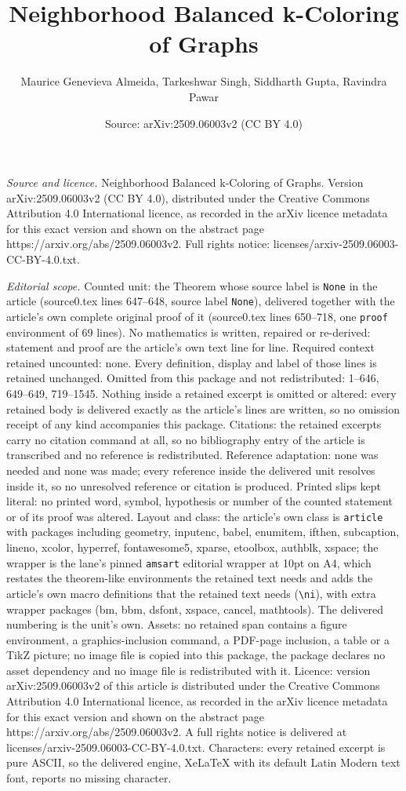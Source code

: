 \documentclass[10pt,a4paper]{amsart}
\title[Neighborhood Balanced k-Coloring of Graphs]{Neighborhood Balanced k-Coloring of Graphs}
\author{Maurice Genevieva Almeida, Tarkeshwar Singh, Siddharth Gupta, Ravindra Pawar}
\date{Source: arXiv:2509.06003v2 (CC BY 4.0)}
\begin{document}
\maketitle

\noindent\emph{Source and licence.} Neighborhood Balanced k-Coloring of Graphs. Version arXiv:2509.06003v2 (CC BY 4.0), distributed under the Creative Commons Attribution 4.0 International licence, as recorded in the arXiv licence metadata for this exact version and shown on the abstract page https://arxiv.org/abs/2509.06003v2. Full rights notice: licenses/arxiv-2509.06003-CC-BY-4.0.txt.\par\smallskip

\noindent\textit{Editorial scope.} Counted unit: the Theorem whose source label is \texttt{None} in the article (source0.tex lines 647--648, source label \texttt{None}), delivered together with the article's own complete original proof of it (source0.tex lines 650--718, one \texttt{proof} environment of 69 lines). No mathematics is written, repaired or re-derived: statement and proof are the article's own text line for line. Required context retained uncounted: none. Every definition, display and label of those lines is retained unchanged. Omitted from this package and not redistributed: 1--646, 649--649, 719--1545. Nothing inside a retained excerpt is omitted or altered: every retained body is delivered exactly as the article's lines are written, so no omission receipt of any kind accompanies this package. Citations: the retained excerpts carry no citation command at all, so no bibliography entry of the article is transcribed and no reference is redistributed. Reference adaptation: none was needed and none was made; every reference inside the delivered unit resolves inside it, so no unresolved reference or citation is produced. Printed slips kept literal: no printed word, symbol, hypothesis or number of the counted statement or of its proof was altered. Layout and class: the article's own class is \texttt{article} with packages including geometry, inputenc, babel, enumitem, ifthen, subcaption, lineno, xcolor, hyperref, fontawesome5, xparse, etoolbox, authblk, xspace; the wrapper is the lane's pinned \texttt{amsart} editorial wrapper at 10pt on A4, which restates the theorem-like environments the retained text needs and adds the article's own macro definitions that the retained text needs (\texttt{\textbackslash ni}), with extra wrapper packages (bm, bbm, dsfont, xspace, cancel, mathtools). The delivered numbering is the unit's own. Assets: no retained span contains a figure environment, a graphics-inclusion command, a PDF-page inclusion, a table or a TikZ picture; no image file is copied into this package, the package declares no asset dependency and no image file is redistributed with it. Licence: version arXiv:2509.06003v2 of this article is distributed under the Creative Commons Attribution 4.0 International licence, as recorded in the arXiv licence metadata for this exact version and shown on the abstract page https://arxiv.org/abs/2509.06003v2. A full rights notice is delivered at licenses/arxiv-2509.06003-CC-BY-4.0.txt. Characters: every retained excerpt is pure ASCII, so the delivered engine, XeLaTeX with its default Latin Modern text font, reports no missing character.
\end{document}
